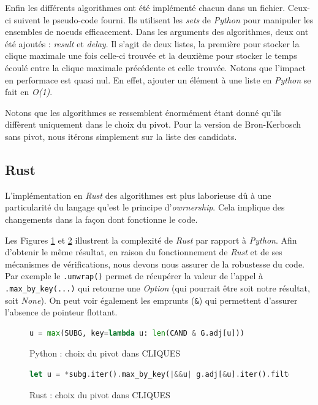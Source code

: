 \documentclass[12pt,a4paper]{article}
\begin{document}
Enfin les différents algorithmes ont été implémenté chacun dans un fichier. Ceux-ci suivent le pseudo-code fourni. Ils utilisent les \emph{sets} de \emph{Python} pour manipuler les ensembles de noeuds efficacement. Dans les arguments des algorithmes, deux ont été ajoutés : \emph{result} et \emph{delay}. Il s'agit de deux listes, la première pour stocker la clique maximale une fois celle-ci trouvée et la deuxième pour stocker le temps écoulé entre la clique maximale précédente et celle trouvée. Notons que l'impact en performace est quasi nul. En effet, ajouter un élément à une liste en \emph{Python} se fait en \emph{O(1)}.

Notons que les algorithmes se ressemblent énormément étant donné qu'ils diffèrent uniquement dans le choix du pivot. Pour la version de Bron-Kerbosch sans pivot, nous itérons simplement sur la liste des candidats.

\subsection{Rust}%
\label{subsec:rust}

L'implémentation en \emph{Rust} des algorithmes est plus laborieuse dû à une particularité du langage qu'est le principe d'\emph{owrnership}\cite{rust}. Cela implique des changements dans la façon dont fonctionne le code.

Les Figures \ref{fig:p1} et \ref{fig:r1} illustrent la complexité de \emph{Rust} par rapport à \emph{Python}. Afin d'obtenir le même résultat, en raison du fonctionnement de \emph{Rust} et de ses mécanismes de vérifications, nous devons nous assurer de la robustesse du code. Par exemple le \verb|.unwrap()| permet de récupérer la valeur de l'appel à \verb|.max_by_key(...)| qui retourne une \emph{Option} (qui pourrait être soit notre résultat, soit \emph{None}). On peut voir également les emprunts (\texttt{\&}) qui permettent d'assurer l'absence de pointeur flottant.

\begin{figure}[ht]
  \begin{lstlisting}[language=Python]
    u = max(SUBG, key=lambda u: len(CAND & G.adj[u]))
  \end{lstlisting}
  \caption{Python : choix du pivot dans CLIQUES}
  \label{fig:p1}
\end{figure}

\begin{figure}[ht]
  \begin{lstlisting}[language=Rust]
    let u = *subg.iter().max_by_key(|&&u| g.adj[&u].iter().filter(|&&neighbor| cand.contains(&neighbor)).count()).unwrap();
  \end{lstlisting}
  \caption{Rust : choix du pivot dans CLIQUES}
  \label{fig:r1}
\end{figure}
\end{document}
